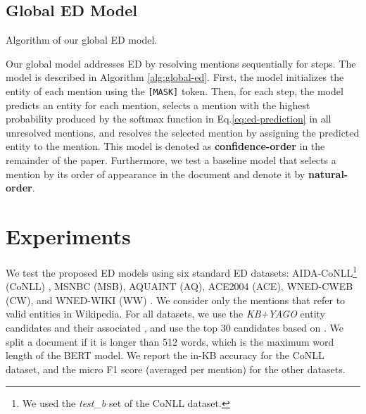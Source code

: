 \documentclass[11pt,a4paper]{article}
\begin{document}
\subsection{Global ED Model}
\label{subsec:global-ed}

\SetAlFnt{\footnotesize}
\SetAlCapFnt{\footnotesize}
\SetAlCapNameFnt{\footnotesize}
\begin{algorithm}[t]
  \SetAlgoLined
  \SetArgSty{}
  \DontPrintSemicolon
  \KwInit{\;}
  \Return{\{}
  \caption{Algorithm of our global ED model.}
  \label{alg:global-ed}
\end{algorithm}

Our global model addresses ED by resolving mentions sequentially for  steps.
The model is described in Algorithm \ref{alg:global-ed}.
First, the model initializes the entity of each mention using the \texttt{[MASK]} token.
Then, for each step, the model predicts an entity for each mention, selects a mention with the highest probability produced by the softmax function in Eq.\eqref{eq:ed-prediction} in all unresolved mentions, and resolves the selected mention by assigning the predicted entity to the mention.
This model is denoted as \textbf{confidence-order} in the remainder of the paper.
Furthermore, we test a baseline model that selects a mention by its order of appearance in the document and denote it by \textbf{natural-order}.

\section{Experiments}
\label{subsec:experimental-setup}

We test the proposed ED models using six standard ED datasets: AIDA-CoNLL\footnote{We used the \textit{test\_b} set of the CoNLL dataset.} (CoNLL) \cite{Hoffart2011}, MSNBC (MSB), AQUAINT (AQ), ACE2004 (ACE), WNED-CWEB (CW), and WNED-WIKI (WW) \cite{guo2018robust}.
We consider only the mentions that refer to valid entities in Wikipedia.
For all datasets, we use the \textit{KB+YAGO} entity candidates and their associated  \cite{ganea-hofmann:2017:EMNLP2017}, and use the top 30 candidates based on .
We split a document if it is longer than 512 words, which is the maximum word length of the BERT model.
We report the in-KB accuracy for the CoNLL dataset, and the micro F1 score (averaged per mention) for the other datasets.
\end{document}
